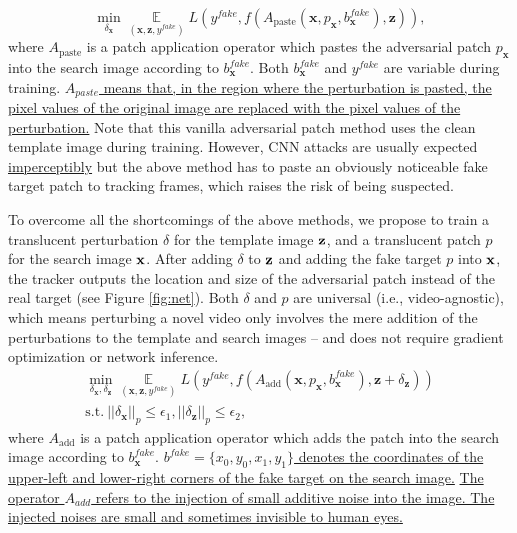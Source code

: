 \documentclass[journal]{IEEEtran}
\newcommand{\ie}{i.e.}
\begin{document}
\begin{equation}
    \min\limits_{\delta_\textbf{x}} \mathop{\mathbb{E}}\limits_{(\textbf{x}, \textbf{z}, y^{fake})} L(y^{fake}, f(A_{\text{paste}}(\textbf{x}, p_\textbf{x}, b^{fake}_{\textbf{x}}), \textbf{z})),
\end{equation}
where $A_{\text{paste}}$ is a patch application operator \cite{patch} which pastes the adversarial patch $p_\textbf{x}$ into the search image according to $b^{fake}_{\textbf{x}}$. Both $b^{fake}_{\textbf{x}}$ and $y^{fake}$ are variable during training.
\uline{$A_{paste}$ means that, in the region where the perturbation is pasted, the pixel values of the original image are replaced with the pixel values of the perturbation.}
Note that this vanilla adversarial patch method uses the clean template image during training. However, CNN attacks are usually expected \uline{imperceptibly} but the above method has to paste an obviously noticeable fake target patch to tracking frames, which raises the risk of being suspected.

To overcome all the shortcomings of the above methods, we propose to train a translucent perturbation $\delta$ for the template image $\textbf z$, and a translucent patch $p$ for the search image $\textbf x$. 
After adding $\delta$ to $\textbf z$ and adding the fake target $p$ into $\textbf x$, the tracker outputs the location and size of the adversarial patch instead of the real target (see Figure \ref{fig:net}). Both $\delta$ and $p$ are universal (\ie, video-agnostic), which means perturbing a novel video only involves the mere addition of the perturbations to the template and search images -- and does not require gradient optimization or network inference.
\begin{equation}
  \begin{gathered}
    \min\limits_{\delta_\textbf{x}, \delta_\textbf{z}} \mathop{\mathbb{E}}\limits_{(\textbf{x}, \textbf{z}, y^{fake})} L(y^{fake}, f(A_{\text{add}}(\textbf{x}, p_\textbf{x}, b^{fake}_{\textbf{x}}), \textbf{z} + \delta_\textbf{z}))\\
    \text{s.t.}\ ||\delta_\textbf{x}||_p \le \epsilon_1, ||\delta_\textbf{z}||_p \le \epsilon_2,
  \end{gathered}
\end{equation}
where $A_{\text{add}}$ is a patch application operator which adds the patch into the search image according to $b^{fake}_{\textbf{x}}$.
\uline{$b^{fake} = \{x_0, y_0, x_1, y_1\}$ denotes the coordinates of the upper-left and lower-right corners of the fake target on the search image.}
\uline{The operator $A_{add}$ refers to the injection of small additive noise into the image. The injected noises are small and sometimes invisible to human eyes.}
\end{document}
